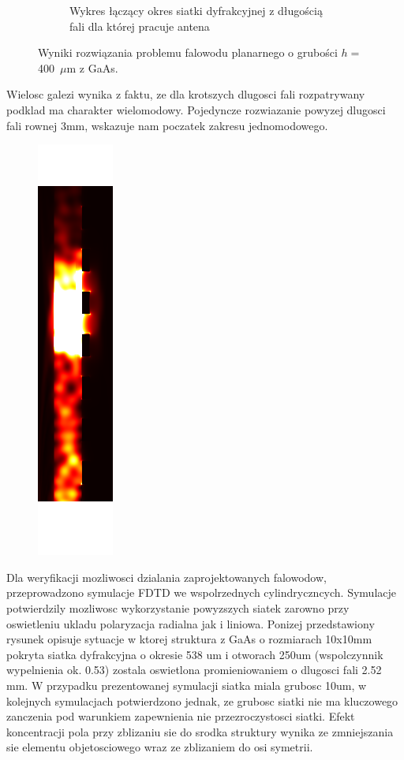 \begin{figure}
\begin{subfigure}{0.5\textwidth}
	\caption{Wykres łączący okres siatki dyfrakcyjnej z długością fali dla której pracuje antena}
	\label{fig:d-lusok}
\end{subfigure}
\caption{Wyniki rozwiązania problemu falowodu planarnego o grubości $h=$400~$\mu$m z GaAs.}
\end{figure}

Wielosc galezi wynika z faktu, ze dla krotszych dlugosci fali rozpatrywany podklad ma charakter wielomodowy. Pojedyncze rozwiazanie powyzej dlugosci fali rownej 3mm, wskazuje nam poczatek zakresu jednomodowego.

\begin{figure}
\includegraphics{images/antenaThz/ro_consrc_radial_antena.png}
\end{figure}

Dla weryfikacji mozliwosci dzialania zaprojektowanych falowodow, przeprowadzono symulacje FDTD we wspolrzednych cylindryczncych. Symulacje potwierdzily mozliwosc wykorzystanie powyzszych siatek zarowno przy oswietleniu ukladu polaryzacja radialna jak  i liniowa. Ponizej przedstawiony rysunek opisuje sytuacje w ktorej struktura z GaAs o rozmiarach 10x10mm pokryta siatka dyfrakcyjna o okresie 538 um i otworach 250um (wspolczynnik wypelnienia ok. 0.53) zostala oswietlona promieniowaniem o dlugosci fali 2.52 mm. W przypadku prezentowanej symulacji siatka miala grubosc 10um, w kolejnych symulacjach potwierdzono jednak, ze grubosc siatki nie ma kluczowego zanczenia pod warunkiem zapewnienia nie przezroczystosci siatki. Efekt koncentracji pola przy zblizaniu sie do srodka struktury wynika ze zmniejszania sie elementu objetosciowego wraz ze zblizaniem do osi symetrii. 



